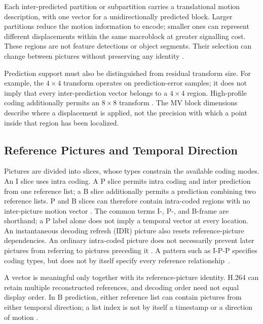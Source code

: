 Each inter-predicted partition or subpartition carries a translational motion
description, with one vector for a unidirectionally predicted block. Larger
partitions reduce the motion information to encode; smaller ones can represent
different displacements within the same macroblock at greater signalling cost.
These regions are not feature detections or object segments. Their selection
can change between pictures without preserving any identity
\cite[Sec.~IV-H]{Wiegand2003Overview}.

Prediction support must also be distinguished from residual transform size.
For example, the $4\times4$ transform operates on prediction-error samples; it
does not imply that every inter-prediction vector belongs to a $4\times4$
region. High-profile coding additionally permits an $8\times8$ transform
\cite[Secs.~8.5 and~A.2.4]{ITUT_H264_2026}. The MV block dimensions describe
where a displacement is applied, not the precision with which a point inside
that region has been localized.

\subsection{Reference Pictures and Temporal Direction}

Pictures are divided into slices, whose types constrain the available coding
modes. An I slice uses intra coding. A P slice permits intra coding and
inter prediction from one reference list; a B slice additionally permits a
prediction combining two reference lists. P and B slices can therefore contain
intra-coded regions with no inter-picture motion vector
\cite[Table~7-10]{ITUT_H264_2026}. The common terms I-, P-, and B-frame are
shorthand; a P label alone does not imply a temporal vector at every location.
An instantaneous decoding refresh (IDR) picture also resets reference-picture
dependencies. An ordinary intra-coded picture does not necessarily prevent
later pictures from referring to pictures preceding it
\cite[Sec.~3.69]{ITUT_H264_2026}.
A pattern such as I-P-P specifies coding types, but does not by itself specify
every reference relationship~\cite[Secs.~7.4.5 and~8.2.4]{ITUT_H264_2026}.

A vector is meaningful only together with its reference-picture identity.
H.264 can retain multiple reconstructed references, and decoding order need
not equal display order. In B prediction, either reference list can contain
pictures from either temporal direction; a list index is not by itself a
timestamp or a direction of motion
\cite[Secs.~IV-H.1 and~IV-H.2]{Wiegand2003Overview}.

